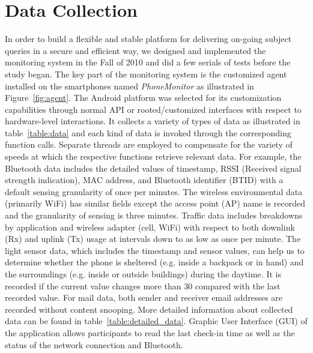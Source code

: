 \section{Data Collection}
In order to build a flexible and stable platform for delivering on-going subject queries in a secure and efficient way, we designed and implemented the monitoring system in the Fall of 2010 and did a few serials of tests before the study began. The key part of the monitoring system is the customized agent installed on the smartphones named \textit{PhoneMonitor} as illustrated in Figure~\ref{fig:agent}. The Android platform was selected for its customization capabilities through normal API or rooted/customized interfaces with respect to hardware-level interactions. It collects a variety of types of data as illustrated in table~\ref{table:data} and each kind of data is invoked through the corresponding function calls. Separate threads are employed to compensate for the variety of speeds at which the respective functions retrieve relevant data. For example, the Bluetooth data includes the detailed values of timestamp, RSSI (Received signal strength indication), MAC address, and Bluetooth identifier (BTID) with a default sensing granularity of once per minutes. The wireless environmental data (primarily WiFi) has similar fields except the access point (AP) name is recorded and the granularity of sensing is three minutes. Traffic data includes breakdowns by application and wireless adapter (cell, WiFi) with respect to both downlink (Rx) and uplink (Tx) usage at intervals down to as low as once per minute. The light sensor data, which includes the timestamp and sensor values, can help us to determine whether the phone is sheltered (e.g. inside a backpack or in hand) and the surroundings (e.g. inside or outside buildings) during the daytime. It is recorded if the current value changes more than 30 compared with the last recorded value. For mail data, both sender and receiver email addresses are recorded without content snooping. More detailed information about collected data can be found in table~\ref{table:detailed_data}. Graphic User Interface (GUI) of the application allows participants to read the last check-in time as well as the status of the network connection and Bluetooth. 

